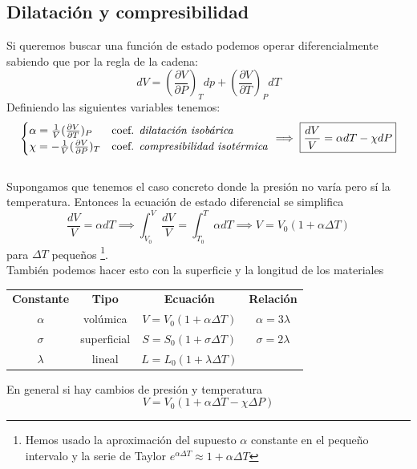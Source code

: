 \documentclass[leqno]{article}
\begin{document}
\subsection{Dilatación y compresibilidad}
Si queremos buscar una función de estado podemos operar diferencialmente sabiendo que por la regla de la cadena:
$$
dV = (\frac{\partial V}{\partial P})_Tdp + (\frac{\partial V}{\partial T})_PdT
$$
Definiendo las siguientes variables tenemos:
$$
\begin{cases}
\alpha = \frac{1}{V}(\frac{\partial V}{\partial T})_P & \text{coef. \textit{dilatación isobárica}} \\
\chi = -\frac{1}{V}(\frac{\partial V}{\partial P})_T & \text{coef. \textit{compresibilidad isotérmica}}
\end{cases}
\implies \boxed{\frac{dV}{V} = \alpha dT - \chi dP}
$$
\\
Supongamos que tenemos el caso concreto donde la presión no varía pero sí la temperatura.
Entonces la ecuación de estado diferencial se simplifica
$$
\frac{dV}{V} = \alpha dT \implies \int_{V_0}^V\frac{dV}{V} = \int_{T_0}^T\alpha dT \implies V=V_0(1+\alpha\Delta T)
$$
para $\Delta T$ pequeños \footnote{\label{fn1} Hemos usado la aproximación del supuesto $\alpha$ constante en el pequeño intervalo y la serie de Taylor $e^{\alpha\Delta T} \approx 1+\alpha \Delta T$}.
\\
También podemos hacer esto con la superficie y la longitud de los materiales
\begin{center}
    \begin{tabular}{c c c c}
    \textbf{Constante} & \textbf{Tipo} & \textbf{Ecuación} & \textbf{Relación} \\
    $\alpha$ & volúmica & $V=V_0(1+\alpha \Delta T)$ & $\alpha = 3\lambda$ \\ 
    $\sigma$ & superficial & $S=S_0(1+\sigma \Delta T)$ & $\sigma = 2\lambda$ \\ 
    $\lambda$ & lineal & $L=L_0(1+\lambda \Delta T)$  &
\end{tabular}
\end{center}
En general si hay cambios de presión y temperatura
$$
V = V_0(1+\alpha\Delta T - \chi \Delta P)
$$
\end{document}
